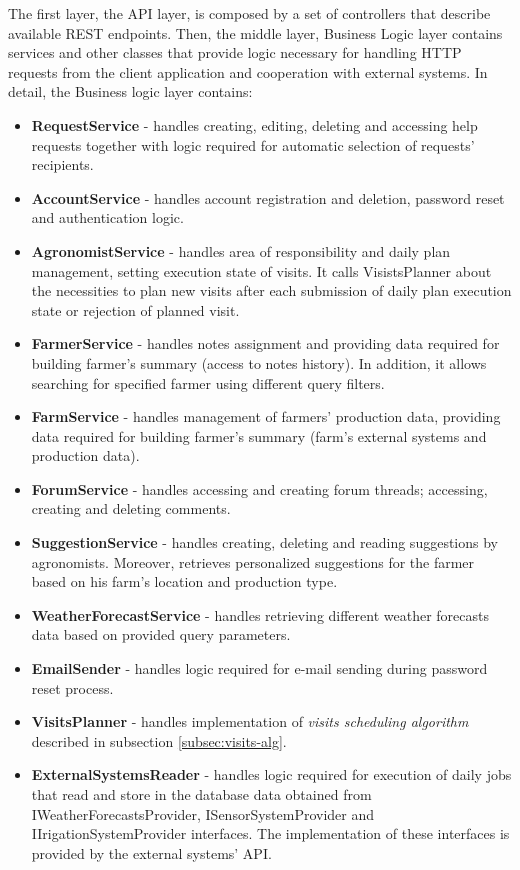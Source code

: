 The first layer, the API layer, is composed by a set of controllers that describe available REST endpoints. Then, the middle layer, Business Logic layer contains services and other classes that provide logic necessary for handling HTTP requests  from the client application and cooperation with external systems. In detail, the Business logic layer contains:
\begin{itemize}
    \item \textbf{RequestService} - handles creating, editing, deleting and accessing help requests together with logic required for automatic selection of requests' recipients.
    \item \textbf{AccountService} - handles account registration and deletion, password reset and authentication logic.
    \item \textbf{AgronomistService} - handles area of responsibility and daily plan management, setting execution state of visits. It calls VisistsPlanner about the necessities to plan new visits after each submission of daily plan execution state or rejection of planned visit.
    \item \textbf{FarmerService} - handles notes assignment and providing data required for building farmer's summary (access to notes history). In addition, it allows searching for specified farmer using different query filters. 
    \item \textbf{FarmService} - handles management of farmers' production data, providing data required for building farmer's summary (farm's external systems and  production data).  
    \item \textbf{ForumService} - handles accessing and creating forum threads; accessing, creating and deleting comments.
    \item \textbf{SuggestionService} - handles creating, deleting and reading suggestions by agronomists. Moreover, retrieves personalized suggestions for the farmer based on his farm's location and production type.
    \item \textbf{WeatherForecastService} - handles retrieving different weather forecasts data based on provided query parameters.
    \item \textbf{EmailSender} - handles logic required for e-mail sending during password reset process.
    \item \textbf{VisitsPlanner} - handles implementation of \textit{visits scheduling algorithm} described in subsection \ref{subsec:visits-alg}.
    \item \textbf{ExternalSystemsReader} - handles logic required for execution of daily jobs that read and store in the database data obtained from IWeatherForecastsProvider, ISensorSystemProvider and IIrigationSystemProvider interfaces. The implementation of these interfaces is provided by the external systems' API. 
\end{itemize}

